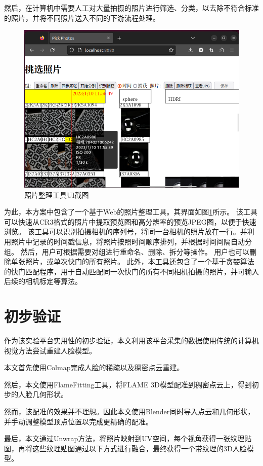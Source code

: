 然后，在计算机中需要人工对大量拍摄的照片进行筛选、分类，以去除不符合标准的照片，并将不同照片送入不同的下游流程处理。
\begin{figure}
\centering
\includegraphics[width=\textwidth]{figures/pick_photo}
\caption{照片整理工具UI截图}
\label{fig:pick_photo}
\end{figure}
为此，本方案中包含了一个基于Web的照片整理工具。其界面如图\ref{fig:pick_photo}所示。
该工具可以快速从CR3格式的照片中提取预览图和高分辨率的预览JPEG图，以便于快速浏览。
该工具可以识别拍摄相机的序列号，将同一台相机的照片放在一行。并利用照片中记录的时间戳信息，将照片按照时间顺序排列，并根据时间间隔自动分组。
然后，用户可根据需要对组进行重命名、删除、拆分等操作。
用户也可以删除单张照片，或单次快门的所有照片。
此外，本工具还包含了一个基于贪婪算法的快门匹配程序，用于自动匹配同一次快门的所有不同相机拍摄的照片，并可输入后续的相机标定等算法。

\section{初步验证}

作为该实验平台实用性的初步验证，本文利用该平台采集的数据使用传统的计算机视觉方法尝试重建人脸模型。

本文首先使用Colmap完成人脸的稀疏以及稠密点云重建。

然后，本文使用FlameFitting工具，将FLAME 3D模型配准到稠密点云上，得到初步的人脸几何形状。

然而，该配准的效果并不理想。因此本文使用Blender同时导入点云和几何形状，并手动调整模型顶点位置以完成更精确的配准。

最后，本文通过Unwrap方法，将照片映射到UV空间，每个视角获得一张纹理贴图，再将这些纹理贴图通过以下方式进行融合，最终获得一个带纹理的3D人脸模型。

